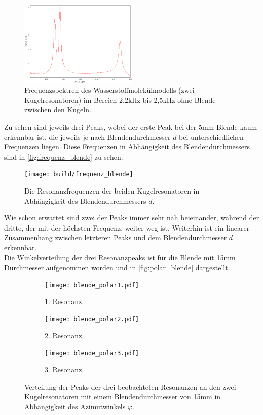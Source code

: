 \begin{figure}
    \centering
    \includegraphics[width=0.5\textwidth]{data/3_1/ohne.png}
    \caption{Frequenzspektren des Wasserstoffmolekülmodells (zwei Kugelresonatoren) im Bereich 2,2\;kHz bis 2,5\;kHz ohne Blende zwischen den Kugeln.}
    \label{fig:ohne}
\end{figure}
Zu sehen sind jeweils drei Peaks, wobei der erste Peak bei der 5\;mm Blende kaum erkennbar ist, 
die jeweils je nach Blendendurchmesser $d$ bei unterschiedlichen Frequenzen liegen. Diese Frequenzen
in Abhängigkeit des Blendendurchmessers sind in \autoref{fig:frequenz_blende} zu sehen.
\begin{figure}
    \centering
    \texttt{[image: build/frequenz\_blende]}
    \caption{Die Resonanzfrequenzen der beiden Kugelresonatoren in Abhängigkeit des Blendendurchmessers $d$.}
    \label{fig:frequenz_blende}
\end{figure} 
Wie schon erwartet sind zwei der Peaks immer sehr nah beieinander, während der dritte, der mit
der höchsten Frequenz, weiter weg ist. Weiterhin ist ein linearer Zusammenhang zwischen
letzteren Peaks und dem Blendendurchmesser $d$ erkennbar. \\
Die Winkelverteilung der drei Resonanzpeaks ist für die Blende mit 15\;mm Durchmesser aufgenommen worden 
und in \autoref{fig:polar_blende} dargestellt.
\begin{figure}[hp]
    \centering
    \begin{subfigure}[b]{0.48\textwidth}
        \centering
        \texttt{[image: blende\_polar1.pdf]}
        \caption{1. Resonanz.}
    \end{subfigure}
    \hfill
    \begin{subfigure}[b]{0.48\textwidth}
        \centering
        \texttt{[image: blende\_polar2.pdf]}
        \caption{2. Resonanz.}
    \end{subfigure}
    \hfill
    \begin{subfigure}[b]{0.48\textwidth}
        \centering
        \texttt{[image: blende\_polar3.pdf]}
        \caption{3. Resonanz.}
    \end{subfigure}
    \hfill
    \caption{Verteilung der Peaks der drei beobachteten Resonanzen an den zwei Kugelresonatoren mit einem Blendendurchmesser von 15\;mm  in Abhängigkeit des Azimutwinkels $\varphi$.}
    \label{fig:polar_blende}
\end{figure}
